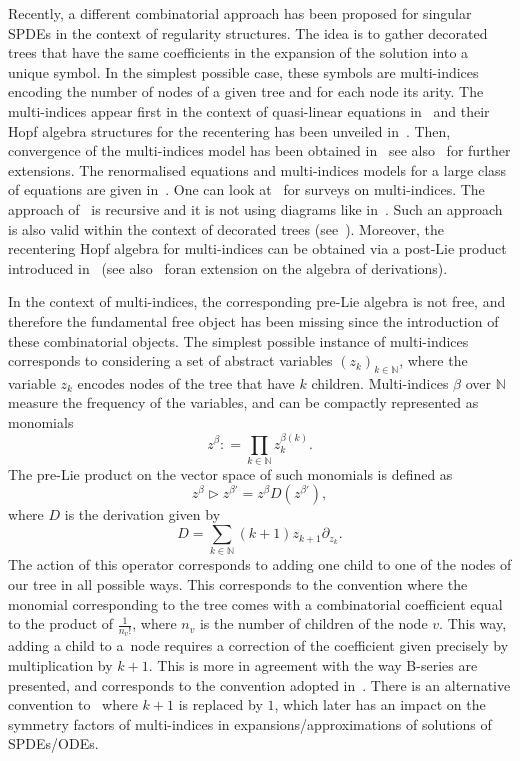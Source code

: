 \documentclass[AHL,Unicode,longabstracts]{cedram}
\newcommand{\bbN}{\mathbb{N}}
\begin{document}
Recently, a different combinatorial approach has been proposed for singular SPDEs in the context of regularity structures. The idea is to gather decorated trees that have the same coefficients in the expansion of the solution into a unique symbol. In the simplest possible case, these symbols are multi-indices encoding the number of nodes of a given tree and for each node its arity. The multi-indices appear first in the context of quasi-linear equations in~\cite{OSSW} and their Hopf algebra structures for the recentering has been unveiled in~\cite{LOT}. Then, convergence of the multi-indices model has been obtained in~\cite{LOTT} see also~\cite{GT,T} for further extensions. The renormalised equations and multi-indices models for a large class of equations are given in~\cite{BL23}. One can look at~\cite{LO23,OST} for surveys on multi-indices. The approach of~\cite{LOTT} is recursive and it is not using diagrams like in~\cite{CH16}. Such an approach is also valid within the context of decorated trees (see~\cite{BH23,BN23,HS}). Moreover, the recentering Hopf algebra for multi-indices can be obtained via a post-Lie product introduced in~\cite{BK23} (see also~\cite{JZ} for\linebreak an extension on the algebra of derivations).

In the context of multi-indices, the corresponding pre-Lie algebra is not free, and therefore the fundamental free object has been missing since the introduction of these combinatorial objects. The simplest possible instance of multi-indices corresponds to considering a set of abstract variables $(z_k)_{k \in \bbN}$, where the variable $z_k$ encodes nodes of the tree that have $k$ children. Multi-indices $\beta$ over $\bbN$ measure the frequency of the variables, and can be compactly represented as monomials
\begin{equation*}
z^{\beta} : = \prod_{k \in \bbN} z_k^{\beta(k)}.
\end{equation*}
The pre-Lie product on the vector space of such monomials is defined as
\begin{equation*}
z^{\beta}\triangleright z^{\beta'}= z^{\beta}D(z^{\beta'}),
\end{equation*}
where $D$ is the derivation given by
\begin{equation*}
D = \sum_{k \in \bbN} (k+1) z_{k+1} \partial_{z_k}.
\end{equation*}
The action of this operator corresponds to adding one child to one of the nodes of our tree in all possible ways. This corresponds to the convention where the monomial corresponding to the tree comes with a combinatorial coefficient equal to the product of $\frac{1}{n_v!}$, where $n_v$ is the number of children of the node $v$. This way, adding a child to a~node requires a correction of the coefficient given precisely by multiplication by $k+1$. This is more in agreement with the way B-series are presented, and corresponds to the convention adopted in~\cite{LOT}. There is an alternative convention to~\cite{BHE25} where $k+1$ is replaced by $1$, which later has an impact on the symmetry factors of multi-indices in expansions/approximations of solutions of SPDEs/ODEs.
\end{document}
